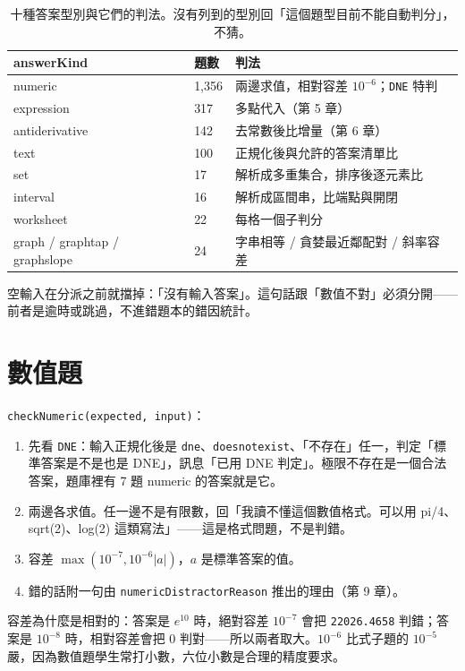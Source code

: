 \documentclass[11pt,a4paper,oneside]{book}
\renewcommand{\_}{\ifmmode\origunderscore\else\textunderscore\allowbreak\fi}
\newcommand{\code}[1]{\texttt{#1}}
\begin{document}
\begin{table}[h]
\centering\small\sffamily
\begin{tabularx}{\textwidth}{@{}llY@{}}
\toprule
answerKind & 題數 & 判法 \\
\midrule
numeric & 1,356 & 兩邊求值，相對容差 $10^{-6}$；\code{DNE} 特判 \\
expression & 317 & 多點代入（第 5 章） \\
antiderivative & 142 & 去常數後比增量（第 6 章） \\
text & 100 & 正規化後與允許的答案清單比 \\
set & 17 & 解析成多重集合，排序後逐元素比 \\
interval & 16 & 解析成區間串，比端點與開閉 \\
worksheet & 22 & 每格一個子判分 \\
graph / graphtap / graphslope & 24 & 字串相等 / 貪婪最近鄰配對 / 斜率容差 \\
\bottomrule
\end{tabularx}
\caption{十種答案型別與它們的判法。沒有列到的型別回「這個題型目前不能自動判分」，不猜。}
\end{table}

空輸入在分派之前就擋掉：「沒有輸入答案」。這句話跟「數值不對」必須分開——前者是逾時或跳過，不進錯題本的錯因統計。

\chapter{數值題}
\code{checkNumeric(expected, input)}：
\begin{enumerate}[label=\arabic*.]
  \item 先看 \code{DNE}：輸入正規化後是 \code{dne}、\code{doesnotexist}、「不存在」任一，判定「標準答案是不是也是 DNE」，訊息「已用 DNE 判定」。極限不存在是一個合法答案，題庫裡有 7 題 numeric 的答案就是它。
  \item 兩邊各求值。任一邊不是有限數，回「我讀不懂這個數值格式。可以用 pi/4、sqrt(2)、log(2) 這類寫法」——這是格式問題，不是判錯。
  \item 容差 $\max(10^{-7}, 10^{-6}|a|)$，$a$ 是標準答案的值。
  \item 錯的話附一句由 \code{numericDistractorReason} 推出的理由（第 9 章）。
\end{enumerate}

容差為什麼是相對的：答案是 $e^{10}$ 時，絕對容差 $10^{-7}$ 會把 \code{22026.4658} 判錯；答案是 $10^{-8}$ 時，相對容差會把 0 判對——所以兩者取大。$10^{-6}$ 比式子題的 $10^{-5}$ 嚴，因為數值題學生常打小數，六位小數是合理的精度要求。
\end{document}
